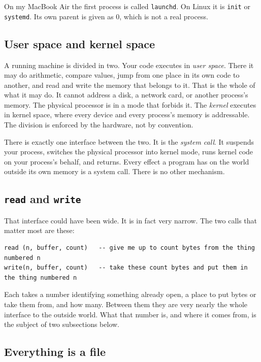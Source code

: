 \documentclass[11pt,a4paper]{article}
\begin{document}
On my MacBook Air the first process is called \texttt{launchd}. On Linux it is \texttt{init} or
\texttt{systemd}. Its own parent is given as 0, which is not a real process.

\subsection{User space and kernel space}

A running machine is divided in two. Your code executes in \emph{user space}. There it may do
arithmetic, compare values, jump from one place in its own code to another, and read and write the
memory that belongs to it. That is the whole of what it may do. It cannot address a disk, a network
card, or another process's memory. The physical processor is in a mode that forbids it. The \emph{kernel} executes
in kernel space, where every device and every process's memory is addressable. The division is
enforced by the hardware, not by convention.

There is exactly one interface between the two. It is the \emph{system call}. It suspends your
process, switches the physical processor into kernel mode, runs kernel code on your process's behalf, and
returns. Every effect a program has on the world outside its own memory is a system call. There is
no other mechanism.

\subsection{\texttt{read} and \texttt{write}}

That interface could have been wide. It is in fact very narrow. The two calls that matter most
are these:

\begin{lstlisting}[language=SH]
read (n, buffer, count)   -- give me up to count bytes from the thing numbered n
write(n, buffer, count)   -- take these count bytes and put them in the thing numbered n
\end{lstlisting}

Each takes a number identifying something already open, a place to put bytes or take them from,
and how many. Between them they are very nearly the whole interface to the outside world. What that
number is, and where it comes from, is the subject of two subsections below.

\subsection{Everything is a file}
\end{document}

